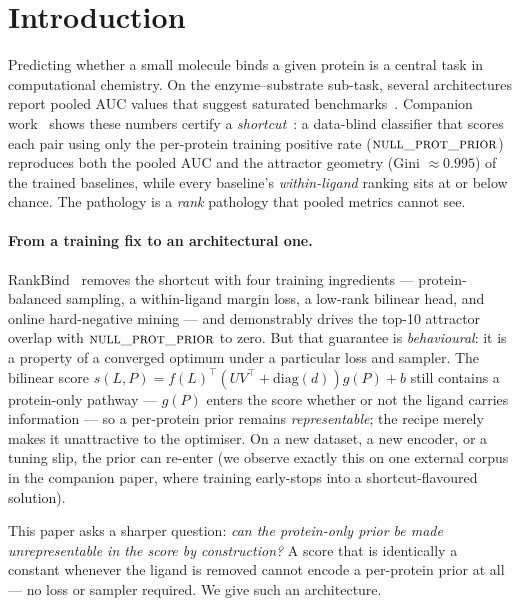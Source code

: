 \documentclass[11pt,a4paper]{article}
\newcommand{\method}{RankBind\xspace}
\newcommand{\nullprior}{\textsc{null\_prot\_prior}\xspace}
\begin{document}
\section{Introduction}
\label{sec:intro}

Predicting whether a small molecule binds a given protein is a central task
in computational chemistry. On the enzyme--substrate sub-task, several
architectures report pooled AUC values that suggest saturated
benchmarks~\citep{bai2023drugban,huang2021moltrans,nguyen2021graphdta,wang2023gems}.
Companion work~\citep{manitz2026rankbind} shows these numbers certify a
\emph{shortcut}~\citep{geirhos2020shortcut}: a data-blind classifier that
scores each pair using only the per-protein training positive rate
($\nullprior$) reproduces both the pooled AUC and the attractor geometry
(Gini $\approx0.995$) of the trained baselines, while every baseline's
\emph{within-ligand} ranking sits at or below chance. The pathology is a
\emph{rank} pathology that pooled metrics cannot see.

\paragraph{From a training fix to an architectural one.}
\method~\citep{manitz2026rankbind} removes the shortcut with four training
ingredients --- protein-balanced sampling, a within-ligand margin loss, a
low-rank bilinear head, and online hard-negative mining --- and demonstrably
drives the top-10 attractor overlap with $\nullprior$ to zero. But that
guarantee is \emph{behavioural}: it is a property of a converged optimum
under a particular loss and sampler. The bilinear score
$s(L,P)=f(L)^{\top}(UV^{\top}+\mathrm{diag}(d))g(P)+b$ still contains a
protein-only pathway --- $g(P)$ enters the score whether or not the ligand
carries information --- so a per-protein prior remains \emph{representable};
the recipe merely makes it unattractive to the optimiser. On a new dataset,
a new encoder, or a tuning slip, the prior can re-enter (we observe exactly
this on one external corpus in the companion paper, where training
early-stops into a shortcut-flavoured solution).

This paper asks a sharper question: \emph{can the protein-only prior be made
unrepresentable in the score by construction?} A score that is identically a
constant whenever the ligand is removed cannot encode a per-protein prior at
all --- no loss or sampler required. We give such an architecture.
\end{document}
